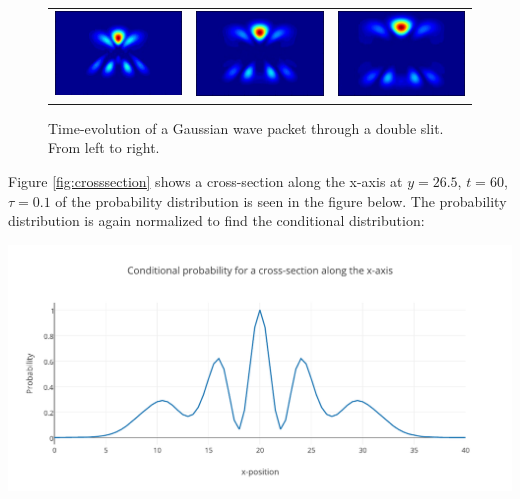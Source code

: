 \begin{figure}[H]
\begin{tabular}{ccc}
  \includegraphics[scale = 0.29]{slit10.png} &   \includegraphics[scale = 0.29]{slit11.png} &   \includegraphics[scale = 0.29]{slit12.png} \\
\end{tabular}
\caption{Time-evolution of a Gaussian wave packet through a double slit. From left to right.}
\label{fig:doubleslit}
\end{figure} Figure \ref{fig:crosssection} shows a cross-section along the x-axis at $y = 26.5$, $t = 60$, $\tau = 0.1$ of the probability distribution is seen in the figure below. The probability distribution is again normalized to find the conditional distribution:

\begin{Figure}
    \centerfloat
    \includegraphics[trim = 3.5mm 0mm 3.5mm 0mm, clip,scale = 0.435]{crosssectiondoubleslit.pdf}
    \label{fig:crosssection}
\end{Figure}
